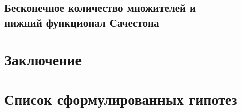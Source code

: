 \documentclass[12pt,a4paper,openbib]{report}
\theoremstyle{definition}
\newcommand\hypotlist{ }
\begin{document}
	\section{Бесконечное количество множителей и \\ нижний функционал Сачестона}
	




\chapter*{Заключение}



\chapter*{Список сформулированных гипотез}

\renewcommand\label[1]{}
\hypotlist



\makeatletter
{}%
{\toggletrue{bbx:gostbibliography}%
\renewcommand*{\revsdnamepunct}{\addcomma}}{}
\makeatother

\printbibliography{}
\end{document}
